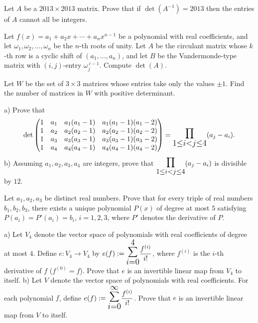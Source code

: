 \documentclass[12pt]{article}
\let\oldsum\sum
\let\oldprod\prod
\renewcommand{\sum}{\mathlarger{\mathlarger{\oldsum}}}
\renewcommand{\prod}{\mathlarger{\mathlarger{\oldprod}}}
\begin{document}
\begin{problem}
Let $A$ be a $2013\times 2013$ matrix. Prove that if $\det(A^{-1})=2013$ then the entries of $A$ cannot all be integers.
\end{problem}

\begin{problem}
Let $f(x)=a_1+a_2x+\cdots+a_nx^{n-1}$ be a polynomial with real coefficients, and let $\omega_1,\omega_2,\dots,\omega_n$ be the $n$-th roots of unity. Let $A$ be the circulant matrix whose $k$-th row is a cyclic shift of $(a_1,\dots,a_n)$, and let $B$ be the Vandermonde-type matrix with $(i,j)$-entry $\omega_j^{\,i-1}$. Compute $\det(A)$.
\end{problem}

\begin{problem}
Let $W$ be the set of $3\times 3$ matrices whose entries take only the values $\pm 1$. Find the number of matrices in $W$ with positive determinant.
\end{problem}

\begin{problem}
a) Prove that
\[
\det\begin{pmatrix}
1 & a_1 & a_1(a_1-1) & a_1(a_1-1)(a_1-2)\\
1 & a_2 & a_2(a_2-1) & a_2(a_2-1)(a_2-2)\\
1 & a_3 & a_3(a_3-1) & a_3(a_3-1)(a_3-2)\\
1 & a_4 & a_4(a_4-1) & a_4(a_4-1)(a_4-2)
\end{pmatrix}
= \prod_{1\leq i<j\leq 4}(a_j-a_i).
\]
b) Assuming $a_1,a_2,a_3,a_4$ are integers, prove that $\prod_{1\leq i<j\leq 4}(a_j-a_i)$ is divisible by $12$.
\end{problem}

\begin{problem}
Let $a_1,a_2,a_3$ be distinct real numbers. Prove that for every triple of real numbers $b_1,b_2,b_3$, there exists a unique polynomial $P(x)$ of degree at most $5$ satisfying $P(a_i)=P'(a_i)=b_i$, $i=1,2,3$, where $P'$ denotes the derivative of $P$.
\end{problem}

\begin{problem}
a) Let $V_4$ denote the vector space of polynomials with real coefficients of degree at most $4$. Define $e:V_4\to V_4$ by $e(f) := \displaystyle\sum_{i=0}^4 \frac{f^{(i)}}{i!}$, where $f^{(i)}$ is the $i$-th derivative of $f$ ($f^{(0)}=f$). Prove that $e$ is an invertible linear map from $V_4$ to itself. b) Let $V$ denote the vector space of polynomials with real coefficients. For each polynomial $f$, define $e(f) := \displaystyle\sum_{i=0}^\infty \frac{f^{(i)}}{i!}$. Prove that $e$ is an invertible linear map from $V$ to itself.
\end{problem}
\end{document}
